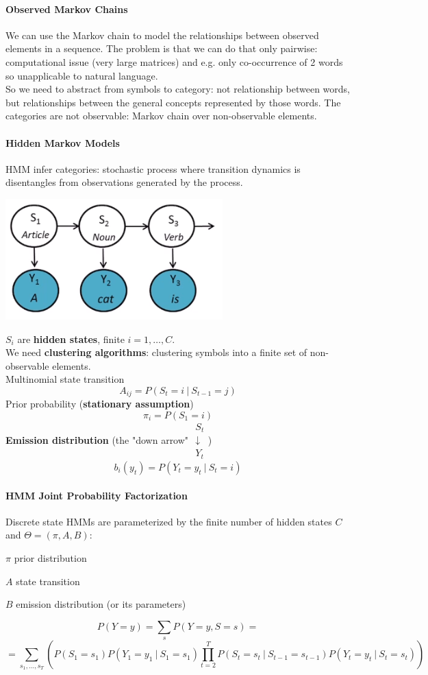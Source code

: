 \documentclass[10pt]{report}
\begin{document}
\paragraph{Observed Markov Chains} We can use the Markov chain to model the relationships between observed elements in a sequence. The problem is that we can do that only pairwise: computational issue (very large matrices) and e.g. only co-occurrence of 2 words so unapplicable to natural language.\\
So we need to abstract from symbols to category: not relationship between words, but relationships between the general concepts represented by those words. The categories are not observable: Markov chain over non-observable elements.
\paragraph{Hidden Markov Models} HMM infer categories: stochastic process where transition dynamics is disentangles from observations generated by the process.\begin{center}
	\includegraphics[scale=0.5]{27.png}
\end{center}
$S_i$ are \textbf{hidden states}, finite $i = 1,\ldots,C$.\\
We need \textbf{clustering algorithms}: clustering symbols into a finite set of non-observable elements.\\
Multinomial state transition
$$A_{ij} = P(S_t=i\:|\:S_{t-1}=j)$$
Prior probability (\textbf{stationary assumption})
$$\pi_i = P(S_1=i)$$
\textbf{Emission distribution} (the "down arrow" $\begin{array}{c}
S_t\\\downarrow\\Y_t
\end{array}$)
$$b_i(y_t) = P(Y_t = y_t\:|\:S_t = i)$$
\paragraph{HMM Joint Probability Factorization} Discrete state HMMs are parameterized by the finite number of hidden states $C$ and $\Theta = (\pi, A, B)$:
\begin{list}{}{}
	\item $\pi$ prior distribution
	\item $A$ state transition
	\item $B$ emission distribution (or its parameters)
\end{list}
$$P(Y = y) = \sum_s P(Y=y,S=s) =$$
$$= \sum_{s_1,\ldots,s_T}\left( P(S_1=s_1)P(Y_1=y_1\:|\:S_1=s_1)\prod_{t=2}^T P(S_t=s_t\:|\:S_{t-1} = s_{t-1})P(Y_t=y_t\:|\:S_t=s_t)\right)$$
\end{document}
